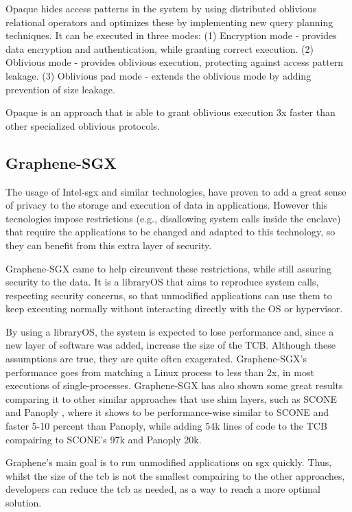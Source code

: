 Opaque hides access patterns in the system by using distributed oblivious relational operators and optimizes these by implementing new query planning techniques. It can be executed in three modes: 
(1) Encryption mode - provides data encryption and authentication, while granting correct execution.
(2) Oblivious mode - provides oblivious execution, protecting against access pattern leakage.
(3) Oblivious pad mode - extends the oblivious mode by adding prevention of size leakage.

Opaque is an approach that is able to grant oblivious execution 3x faster than other specialized oblivious protocols.

\subsection{Graphene-SGX}
\label{ssec:grapheneSGX}

The usage of Intel-\gls{sgx} and similar technologies, have proven to add a great sense of privacy to the storage and execution of data in applications. However this tecnologies impose restrictions (e.g., disallowing system calls inside the enclave) that require the applications to be changed and adapted to this technology, so they can benefit from this extra layer of security. 

Graphene-SGX \cite{graphenePaper} came to help circunvent these restrictions, while still assuring security to the data. It is a libraryOS that aims to reproduce system calls, respecting security concerns, so that unmodified applications can use them to keep executing normally without interacting directly with the OS or hypervisor. 

By using a libraryOS, the system is expected to lose performance and, since a new layer of software was added, increase the size of the TCB. 
Although these assumptions are true, they are quite often exagerated. Graphene-SGX's performance goes from matching a Linux process to less than 2x, in most executions of single-processes.
Graphene-SGX has also shown some great results comparing it to other similar approaches that use shim layers, such as SCONE \cite{sconePaper} and Panoply \cite{panoplyPaper}, where it shows to be performance-wise similar to SCONE and faster 5-10 percent than Panoply, while adding 54k lines of code to the TCB compairing to SCONE's 97k and Panoply 20k.

Graphene's main goal is to run unmodified applications on \gls{sgx} quickly. Thus, whilst the size of the \gls{tcb} is not the smallest compairing to the other approaches, developers can reduce the \gls{tcb} as needed, as a way to reach a more optimal solution. 

